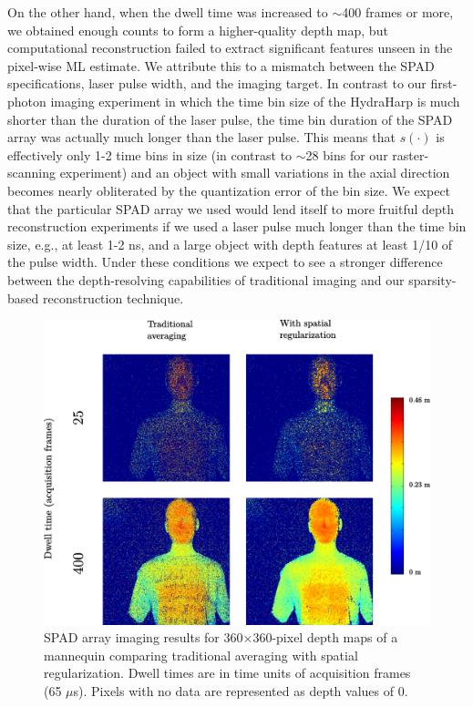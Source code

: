 On the other hand, when the dwell time was increased to $\sim$400 frames or more, we obtained enough counts to form a higher-quality depth map, but computational reconstruction failed to extract significant features unseen in the pixel-wise ML estimate. We attribute this to a mismatch between the SPAD specifications, laser pulse width, and the imaging target. In contrast to our first-photon imaging experiment in which the time bin size of the HydraHarp is much shorter than the duration of the laser pulse, the time bin duration of the SPAD array was actually much longer than the laser pulse. This means that $s(\cdot)$ is effectively only 1-2 time bins in size (in contrast to $\sim$28 bins for our raster-scanning experiment) and an object with small variations in the axial direction becomes nearly obliterated by the quantization error of the bin size. We expect that the particular SPAD array we used would lend itself to more fruitful depth reconstruction experiments if we used a laser pulse much longer than the time bin size, e.g., at least 1-2 ns, and a large object with depth features at least 1/10 of the pulse width. Under these conditions we expect to see a stronger difference between the depth-resolving capabilities of traditional imaging and our sparsity-based reconstruction technique.

\begin{figure}[h!]
\centerline{\includegraphics[width=15cm]{figure-first-spad-mannequin-d.pdf}}
\caption{SPAD array imaging results for 360$\times$360-pixel depth maps of a mannequin comparing traditional averaging with spatial regularization. Dwell times are in time units of acquisition frames (65 $\mu$s). Pixels with no data are represented as depth values of $0$.}
\label{figure:first-spad-mannequin-d}
\end{figure}

